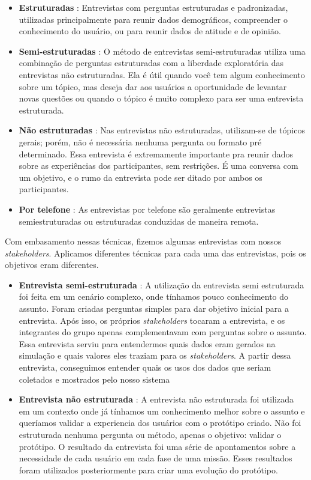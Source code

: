\begin{itemize}
\item \textbf{Estruturadas} : Entrevistas com perguntas estruturadas e padronizadas, utilizadas principalmente para reunir dados demográficos, compreender o conhecimento do usuário, ou para reunir dados de atitude e de opinião.
\item \textbf{Semi-estruturadas} : O método de entrevistas semi-estruturadas utiliza uma combinação de perguntas estruturadas com a liberdade exploratória das entrevistas não estruturadas.
Ela é útil quando você tem algum conhecimento sobre um tópico, mas deseja dar aos usuários a oportunidade de levantar novas questões ou quando o tópico é muito complexo para ser uma entrevista estruturada.
\item \textbf{Não estruturadas} : Nas entrevistas não estruturadas, utilizam-se de tópicos gerais; porém, não é necessária nenhuma pergunta ou formato pré determinado. Essa entrevista é extremamente importante pra reunir dados sobre as experiências dos participantes, sem restrições. É uma conversa com um objetivo, e o rumo da entrevista pode ser ditado por ambos os participantes.
\item \textbf{Por telefone} : As entrevistas por telefone são geralmente entrevistas semiestruturadas ou estruturadas conduzidas de maneira remota.
\end{itemize}

\par Com embasamento nessas técnicas, fizemos algumas entrevistas com nossos \textit{stakeholders}. Aplicamos diferentes técnicas para cada uma das entrevistas, pois os objetivos eram diferentes.

\begin{itemize}
\item \textbf{Entrevista semi-estruturada} : A utilização da entrevista semi estruturada foi feita em um cenário complexo, onde tínhamos pouco conhecimento do assunto.
Foram criadas perguntas simples para dar objetivo inicial para a entrevista. Após isso, os próprios \textit{stakeholders} tocaram a entrevista, e os integrantes do grupo apenas complementavam com perguntas sobre o assunto. 
Essa entrevista serviu para entendermos quais dados eram gerados na simulação e quais valores eles traziam para os \textit{stakeholders}. A partir dessa entrevista, conseguimos entender quais os usos dos dados que seriam coletados e mostrados pelo nosso sistema
\item \textbf{Entrevista não estruturada} : A entrevista não estruturada foi utilizada em um contexto onde já tínhamos um conhecimento melhor sobre o assunto e queríamos validar a experiencia dos usuários com o protótipo criado.
Não foi estruturada nenhuma pergunta ou método, apenas o objetivo: validar o protótipo.
O resultado da entrevista foi uma série de apontamentos sobre a necessidade de cada usuário em cada fase de uma missão. Esses resultados foram utilizados posteriormente para criar uma evolução do protótipo.
\end{itemize}

